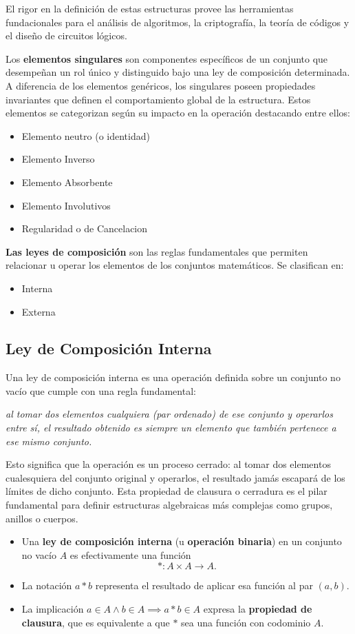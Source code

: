 \documentclass{article}
\begin{document}
El rigor en la definición de estas estructuras provee las herramientas fundacionales para el análisis de algoritmos, la criptografía, la teoría de códigos y el diseño de circuitos lógicos.

Los \textbf{elementos singulares} son componentes específicos de un conjunto que desempeñan un rol único y distinguido bajo una ley de composición determinada. A diferencia de los elementos genéricos, los singulares poseen propiedades invariantes que definen el comportamiento global de la estructura.
Estos elementos se categorizan según su impacto en la operación destacando entre ellos: 
\begin{itemize}
\item Elemento neutro (o identidad)
\item Elemento Inverso
\item Elemento Absorbente
\item Elemento Involutivos
\item Regularidad o de Cancelacion
\end{itemize}

\textbf{Las leyes de composición} son las reglas fundamentales que permiten relacionar u operar los elementos de los conjuntos matemáticos. Se clasifican en:
\begin{itemize}
    \item Interna
    \item Externa
\end{itemize}

\subsection{Ley de Composición Interna} 
\label{sec:leyes_de_composicion_interna}

Una ley de composición interna es una operación definida sobre un conjunto no vacío que cumple con una regla fundamental: 
\bigskip

\textit{al tomar dos elementos cualquiera (par ordenado) de ese conjunto y operarlos entre sí, el resultado obtenido es siempre un elemento que también pertenece a ese mismo conjunto.}
\bigskip

Esto significa que la operación es un proceso cerrado: al tomar dos elementos cualesquiera del conjunto original y operarlos, el resultado jamás escapará de los límites de dicho conjunto. Esta propiedad de clausura o cerradura es el pilar fundamental para definir estructuras algebraicas más complejas como grupos, anillos o cuerpos.
\begin{itemize}
    \item Una \textbf{ley de composición interna} (u \textbf{operación binaria}) en un conjunto no vacío $A$ es efectivamente una función
    \[ \ast : A \times A \longrightarrow A. \]
    \item La notación $a \ast b$ representa el resultado de aplicar esa función al par $(a,b)$.
    \item La implicación $a \in A \land b \in A \implies a \ast b \in A$ expresa la \textbf{propiedad de clausura}, que es equivalente a que $\ast$ sea una función con codominio $A$.
\end{itemize}
\end{document}
